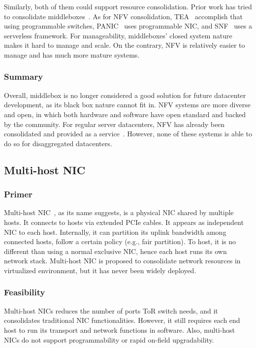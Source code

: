 Similarly, both of them could support resource consolidation.
Prior work has tried to consolidate middleboxes~\cite{comb-nsdi12}.
As for NFV consolidation, TEA~\cite{tea-sigcomm20} accomplish that using programmable switches,
PANIC~\cite{panic-osdi20} uses programmable NIC,
and SNF~\cite{snf-socc20} uses a serverless framework.
For manageability, middleboxes' closed system nature makes it hard to manage and scale.
On the contrary, NFV is relatively easier to manage and has much more mature systems.

\subsubsection{Summary}

Overall, middlebox is no longer considered a good
solution for future datacenter development,
as its black box nature cannot fit in.
NFV systems are more diverse and open,
in which both hardware and software have open standard and
backed by the community.
For regular server datacenters,
NFV has already been consolidated and provided as a service~\cite{tea-sigcomm20,snf-socc20,panic-osdi20}.
However, none of these systems is able
to do so for disaggregated datacenters.


\subsection{Multi-host NIC}
\subsubsection{Primer}
Multi-host NIC~\cite{Intel-RedRockCanyon,Mellanox-Multihost}, as its name suggests, is a physical NIC shared by multiple hosts.
It connects to hosts via extended PCIe cables.
It appears as independent NIC to each host.
Internally, it can partition its uplink bandwidth among connected hosts,
follow a certain policy (e.g., fair partition).
To host, it is no different than using a normal exclusive NIC,
hence each host runs its own network stack.
Multi-host NIC is proposed to consolidate network resources
in virtualized environment, but it has never been widely deployed.

\subsubsection{Feasibility}

Multi-host NICs reduces the number of ports ToR switch needs,
and it consolidates traditional NIC functionalities.
However, it still requires each end host to run its transport and network
functions in software.
Also, multi-host NICs do not support programmability or rapid on-field upgradability.

